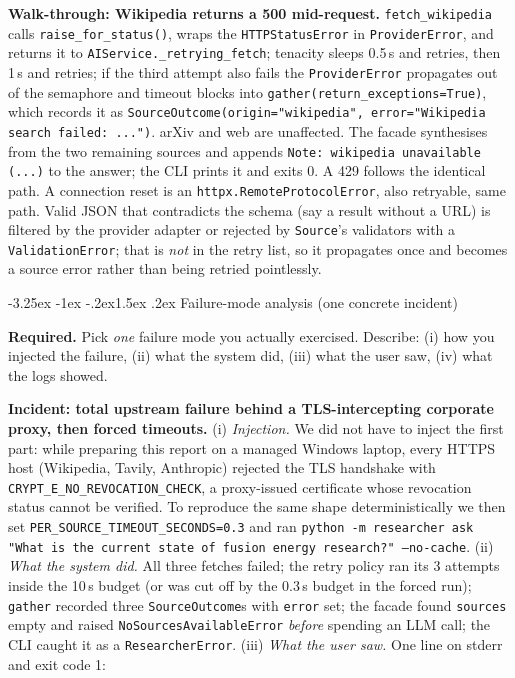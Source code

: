 \documentclass[11pt,a4paper]{article}
\makeatletter
\renewcommand\subsection{\@startsection{subsection}{2}{\z@}%
    {-3.25ex \@plus -1ex \@minus -.2ex}{1.5ex \@plus .2ex}%
    {\normalfont\large\bfseries\color{accent}}}%
\makeatother
\begin{document}
\textbf{Walk-through: Wikipedia returns a 500 mid-request.} \texttt{fetch\_wikipedia} calls \texttt{raise\_for\_status()}, wraps the \texttt{HTTPStatusError} in \texttt{ProviderError}, and returns it to \texttt{AIService.\_retrying\_fetch}; tenacity sleeps 0.5\,s and retries, then 1\,s and retries; if the third attempt also fails the \texttt{ProviderError} propagates out of the semaphore and timeout blocks into \texttt{gather(return\_exceptions=True)}, which records it as \texttt{SourceOutcome(origin="wikipedia", error="Wikipedia search failed: ...")}. arXiv and web are unaffected. The facade synthesises from the two remaining sources and appends \texttt{Note: wikipedia unavailable (...)} to the answer; the CLI prints it and exits 0. A 429 follows the identical path. A connection reset is an \texttt{httpx.RemoteProtocolError}, also retryable, same path. Valid JSON that contradicts the schema (say a result without a URL) is filtered by the provider adapter or rejected by \texttt{Source}'s validators with a \texttt{ValidationError}; that is \emph{not} in the retry list, so it propagates once and becomes a source error rather than being retried pointlessly.

\subsection{Failure-mode analysis (one concrete incident)}

\begin{deliverbox}
\textbf{Required.} Pick \emph{one} failure mode you actually exercised. Describe: (i) how you injected the failure, (ii) what the system did, (iii) what the user saw, (iv) what the logs showed.
\end{deliverbox}

\textbf{Incident: total upstream failure behind a TLS-intercepting corporate proxy, then forced timeouts.} (i) \emph{Injection.} We did not have to inject the first part: while preparing this report on a managed Windows laptop, every HTTPS host (Wikipedia, Tavily, Anthropic) rejected the TLS handshake with \texttt{CRYPT\_E\_NO\_REVOCATION\_CHECK}, a proxy-issued certificate whose revocation status cannot be verified. To reproduce the same shape deterministically we then set \texttt{PER\_SOURCE\_TIMEOUT\_SECONDS=0.3} and ran \texttt{python -m researcher ask "What is the current state of fusion energy research?" --no-cache}. (ii) \emph{What the system did.} All three fetches failed; the retry policy ran its 3 attempts inside the 10\,s budget (or was cut off by the 0.3\,s budget in the forced run); \texttt{gather} recorded three \texttt{SourceOutcome}s with \texttt{error} set; the facade found \texttt{sources} empty and raised \texttt{NoSourcesAvailableError} \emph{before} spending an LLM call; the CLI caught it as a \texttt{ResearcherError}. (iii) \emph{What the user saw.} One line on stderr and exit code 1:
\end{document}
